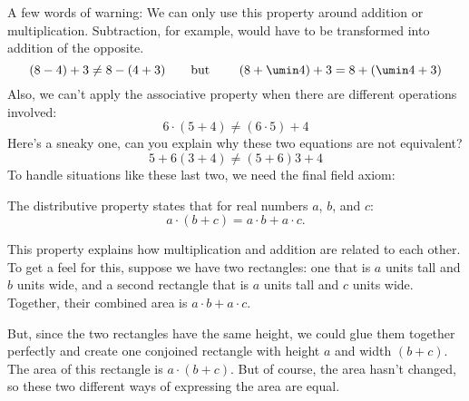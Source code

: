 A few words of warning: We can only use this property around addition or multiplication. Subtraction, for example, would have to be transformed into addition of the opposite.
\[(8 - 4) + 3 \neq 8 - (4 + 3) \text{\qquad but \qquad} (8 + \umin4) + 3 = 8 + (\umin4 + 3)\]
Also, we can't apply the associative property when there are different operations involved:
\[6 \cdot (5 + 4) \neq (6 \cdot 5) + 4\]
Here's a sneaky one, can you explain why these two equations are not equivalent?
\[5 + 6(3 + 4) \neq (5 + 6)3 + 4\]
To handle situations like these last two, we need the final field axiom:

\begin{boxdef}
\raggedright %
The \gls{distributive property} states that for real numbers $a$, $b$, and $c$:
\[a \cdot (b+c) = a\cdot b + a\cdot c.\]
\end{boxdef}

This property explains how multiplication and addition are related to each other. To get a feel for this, suppose we have two rectangles: one that is $a$ units tall and $b$ units wide, and a second rectangle that is $a$ units tall and $c$ units wide. Together, their combined area is $a \cdot b + a \cdot c$.

But, since the two rectangles have the same height, we could glue them together perfectly and create one conjoined rectangle with height $a$ and width $(b+c)$. The area of this rectangle is $a \cdot (b+c)$. But of course, the area hasn't changed, so these two different ways of expressing the area are equal.

